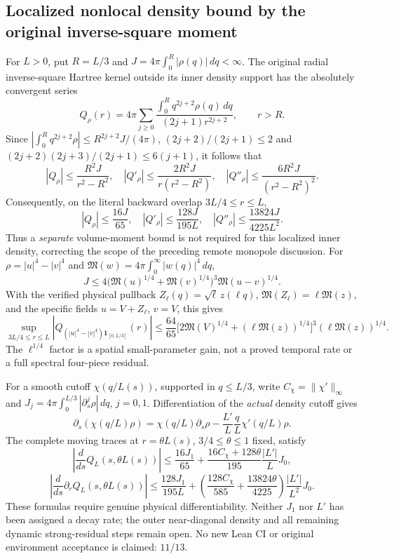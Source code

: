 
\subsection*{Localized nonlocal density bound by the original inverse-square moment}
\noindent
For $L>0$, put $R=L/3$ and
$J=4\pi\int_0^R|\rho(q)|\,dq<\infty$.
The original radial inverse-square Hartree kernel outside its
inner density support has the absolutely convergent series
\[
 Q_\rho(r)=4\pi\sum_{j\ge0}
  \frac{\int_0^R q^{2j+2}\rho(q)\,dq}{(2j+1)r^{2j+2}},
 \qquad r>R.
\]
Since $|\int_0^R q^{2j+2}\rho|\le R^{2j+2}J/(4\pi)$,
$(2j+2)/(2j+1)\le2$ and
$(2j+2)(2j+3)/(2j+1)\le6(j+1)$, it follows that
\[
 |Q_\rho|\le\frac{R^2J}{r^2-R^2},\quad
 |Q'_\rho|\le\frac{2R^2J}{r(r^2-R^2)},\quad
 |Q''_\rho|\le\frac{6R^2J}{(r^2-R^2)^2}.
\]
Consequently, on the literal backward overlap $3L/4\le r\le L$,
\[
 \boxed{|Q_\rho|\le\frac{16J}{65},\quad
 |Q'_\rho|\le\frac{128J}{195L},\quad
 |Q''_\rho|\le\frac{13824J}{4225L^2}.}
\]
Thus a \emph{separate} volume-moment bound is not required for
this localized inner density, correcting the scope of the preceding
remote monopole discussion. For
$\rho=|u|^4-|v|^4$ and
$\mathfrak M(w)=4\pi\int_0^\infty|w(q)|^4\,dq$,
\[
 J\le4\big(\mathfrak M(u)^{1/4}
 +\mathfrak M(v)^{1/4}\big)^3\mathfrak M(u-v)^{1/4}.
\]
With the verified physical pullback
$Z_\ell(q)=\sqrt\ell\,z(\ell q)$,
$\mathfrak M(Z_\ell)=\ell\mathfrak M(z)$, and the
specific fields $u=V+Z_\ell$, $v=V$, this gives
\[
 \sup_{3L/4\le r\le L}|Q_{(|u|^4-|v|^4)\mathbf1_{[0,L/3]}}(r)|
 \le\frac{64}{65}
 \big[2\mathfrak M(V)^{1/4}
       +(\ell\mathfrak M(z))^{1/4}\big]^3
       (\ell\mathfrak M(z))^{1/4}.
\]
The $\ell^{1/4}$ factor is a spatial small-parameter gain,
not a proved temporal rate or a full spectral four-piece residual.

For a smooth cutoff $\chi(q/L(s))$, supported in $q\le L/3$,
write $C_\chi=\|\chi'\|_\infty$ and
$J_j=4\pi\int_0^{L/3}|\partial_s^j\rho|\,dq$, $j=0,1$.
Differentiation of the \emph{actual} density cutoff gives
\[
 \partial_s(\chi(q/L)\rho)
 =\chi(q/L)\partial_s\rho
 -\frac{L'}{L}\frac qL\chi'(q/L)\rho.
\]
The complete moving traces at $r=\theta L(s)$,
$3/4\le\theta\le1$ fixed, satisfy
\[
 \left|\frac{d}{ds}Q_L(s,\theta L(s))\right|
 \le\frac{16J_1}{65}+
 \frac{16C_\chi+128\theta}{195}
 \frac{|L'|}{L}J_0,
\]
\[
 \left|\frac{d}{ds}\partial_rQ_L(s,\theta L(s))\right|
 \le\frac{128J_1}{195L}+
 \left(\frac{128C_\chi}{585}
 +\frac{13824\theta}{4225}\right)\frac{|L'|}{L^2}J_0.
\]
These formulas require genuine physical differentiability.
Neither $J_1$ nor $L'$ has been assigned a decay rate;
the outer near-diagonal density and all remaining dynamic
strong-residual steps remain open. No new Lean CI or original
environment acceptance is claimed: $11/13$.

